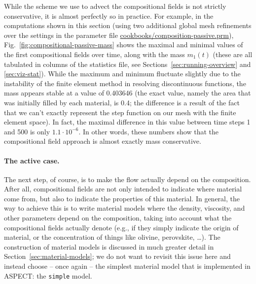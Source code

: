 \documentclass{article}
\newcommand{\aspect}{\textsc{ASPECT}}
\begin{document}
While the scheme we use to advect the compositional fields is not strictly
conservative, it is almost perfectly so in practice. For example, in
the computations shown in this section (using two additional global mesh
refinements over the settings in the parameter file
\url{cookbooks/composition-passive.prm}), Fig.~\ref{fig:compositional-passive-mass}
shows the maximal and minimal values of the first compositional fields over time,
along with the mass $m_1(t)$ (these are all tabulated in columns of the
statistics file, see Sections~\ref{sec:running-overview} and \ref{sec:viz-stat}). While
the maximum and minimum fluctuate slightly due to the instability of the finite element
method in resolving discontinuous functions,
the mass appears stable at a value of 0.403646 (the exact value, namely the
area that was initially filled by each material, is 0.4; the difference is a
result of the fact that we can't exactly represent the step function on our
mesh with the finite element space). In fact, the maximal difference in this
value between time steps 1 and 500 is only $1.1\cdot 10^{-6}$. In other words,
these numbers show that the compositional field approach is almost exactly mass conservative.


\paragraph{The active case.} The next step, of course, is to make the flow
actually depend on the composition. After all, compositional fields are not only
intended to indicate where material come from, but also to indicate the
properties of this material. In general, the way to achieve this is to write
material models where the density, viscosity, and other parameters depend on the
composition, taking into account what the compositional fields actually denote
(e.g., if they simply indicate the origin of material, or the concentration of
things like olivine, perovskite, \ldots). The construction of material models is
discussed in much greater detail in Section~\ref{sec:material-models}; we do not
want to revisit this issue here and instead choose -- once again -- the simplest
material model that is implemented in \aspect{}: the \texttt{simple} model.
\end{document}
